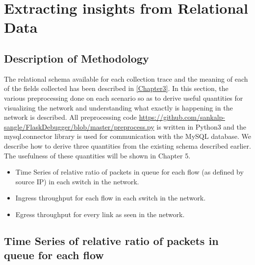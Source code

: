 
\chapter{Extracting insights from Relational Data} %

\label{Chapter4} %



\section{Description of Methodology}

The relational schema available for each collection trace and the meaning of each of the fields collected has been described in \ref{Chapter3}.
In this section, the various preprocessing done on each scenario so as to derive useful quantities for visualizing the network and understanding
what exactly is happening in the network is described. All preprocessing code \url{https://github.com/sankalp-sangle/FlaskDebugger/blob/master/preprocess.py} is written in Python3
and the mysql.connector library is used for communication with the MySQL database.
\newline
We describe how to derive three quantities from the existing schema described earlier. The usefulness of these quantities will be shown in Chapter 5.

\begin{itemize}
    \item Time Series of relative ratio of packets in queue for each flow (as defined by source IP) in each switch in the network.
    \item Ingress throughput for each flow in each switch in the network.
    \item Egress throughput for every link as seen in the network.
\end{itemize}

\section{Time Series of relative ratio of packets in queue for each flow}

